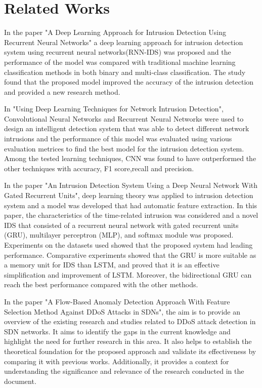 \section{Related Works}
\vspace{-18pt}
In the paper "A Deep Learning Approach for Intrusion Detection Using Recurrent Neural Networks" a deep learning approach for intrusion detection system using recurrent neural networks(RNN-IDS) was proposed and the performance of the model was compared with traditional machine learning classification methods in both binary and multi-class classification. The study found that the proposed model improved the accuracy of the intrusion detection and provided a new research method.\cite{yin2017deep}
\par 
In "Using Deep Learning Techniques for Network Intrusion Detection", Convolutional Neural Networks and Recurrent Neural Networks were used to design an intelligent detection system that was able to detect different network intrusions and the performance of this model was evaluated using various evaluation metrices to find the best model for the intrusion detection system. Among the tested learning techniques, CNN was found to have outperformed the other techniques with accuracy, F1 score,recall and precision.\cite{al2020using}
\par 
In the paper "An Intrusion Detection System Using a Deep Neural Network With Gated Recurrent Units", deep learning theory was applied to intrusion detection system and a model was developed that had automatic feature extraction. In this paper, the characteristics of the time-related intrusion was considered and a novel IDS that consisted of a recurrent neural network with gated recurrent units (GRU), multilayer perceptron (MLP), and softmax module was proposed. Experiments on the datasets used showed that the proposed system had leading performance. Comparative experiments showed that the GRU is more suitable as a memory unit for IDS than LSTM, and proved that it is an effective simplification and improvement of LSTM. Moreover, the bidirectional GRU can reach the best performance compared with the other methods.\cite{xu2018intrusion}
\par 
In the paper "A Flow-Based Anomaly Detection Approach With Feature Selection Method Against DDoS Attacks in SDNs", the aim is to provide an overview of the existing research and studies related to DDoS attack detection in SDN networks. It aims to identify the gaps in the current knowledge and highlight the need for further research in this area. It also helps to establish the theoretical foundation for the proposed approach and validate its effectiveness by comparing it with previous works. Additionally, it provides a context for understanding the significance and relevance of the research conducted in the document.\cite{9810168}
